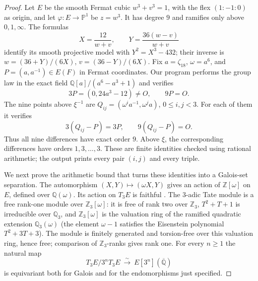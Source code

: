 \begin{proof}
Let $E$ be the smooth Fermat cubic $w^3+v^3=1$, with the flex
$(1:-1:0)$ as origin, and let $\varphi:E\to\mathbb P^1$ be $z=w^3$.
It has degree $9$ and ramifies only above $0,1,\infty$.  The formulas
\[
 X=\frac{12}{w+v},\qquad Y=\frac{36(w-v)}{w+v}
\]
identify its smooth projective model with $Y^2=X^3-432$; their inverse is
$w=(36+Y)/(6X)$, $v=(36-Y)/(6X)$.  Fix $a=\zeta_{18}$,
$\omega=a^6$, and $P=(a,a^{-1})\in E(F)$ in Fermat coordinates.
Our program performs the group law in the exact field
$\mathbb Q[a]/(a^6-a^3+1)$ and verifies
\[
 3P=(0,24a^3-12)\ne O,\qquad9P=O.
\]
The nine points above $\xi^{-1}$ are
$Q_{ij}=(\omega^i a^{-1},\omega^j a)$, $0\leq i,j<3$.
For each of them it verifies
\[
 3(Q_{ij}-P)=3P,\qquad9(Q_{ij}-P)=O.
\]
Thus all nine differences have exact order $9$.  Above $\xi$, the
corresponding differences have orders $1,3,\ldots,3$.
These are finite identities checked using rational arithmetic; the output
prints every pair $(i,j)$ and every triple.

We next prove the arithmetic bound that turns these identities into a
Galois-set separation.  The automorphism
$(X,Y)\mapsto(\omega X,Y)$ gives an action of
$\mathbb Z[\omega]$ on $E$, defined over $\mathbb Q(\omega)$.
Its action on $T_3E$ is faithful
\cite[II, Proposition 6.7]{D_MilneEC}.
The $3$-adic Tate module is a free rank-one module over
$\mathbb Z_3[\omega]$: it is free of rank two over $\mathbb Z_3$,
$T^2+T+1$ is irreducible over $\mathbb Q_3$, and
$\mathbb Z_3[\omega]$ is the valuation ring of the ramified quadratic
extension $\mathbb Q_3(\omega)$ (the element $\omega-1$ satisfies the
Eisenstein polynomial $T^2+3T+3$).  The module is finitely generated and
torsion-free over this valuation ring, hence free; comparison of
$\mathbb Z_3$-ranks gives rank one.  For every $n\geq1$ the natural map
\[
 T_3E/3^nT_3E\ \xrightarrow{\sim}\ E[3^n](\overline{\mathbb Q})
\]
is equivariant both for Galois and for the endomorphisms just specified.


\end{proof}
